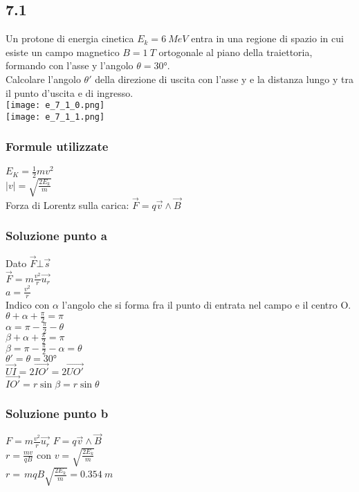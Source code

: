 \documentclass[../../main.tex]{subfiles}
\begin{document}
\subsection*{7.1}
Un protone di energia cinetica $E_k = 6\ MeV$ entra in una regione di spazio in cui esiste un campo magnetico $B = 1\ T$ ortogonale al piano della traiettoria, formando con l'asse y l'angolo $\theta = 30°$.
\\Calcolare l'angolo $\theta'$ della direzione di uscita con l'asse y e la distanza lungo y tra il punto d'uscita e di ingresso.
\\\texttt{[image: e\_7\_1\_0.png]}
\\\texttt{[image: e\_7\_1\_1.png]}
\subsubsection*{Formule utilizzate}
$E_K = \frac{1}{2}mv^2$
\\$|v| = \sqrt{\frac{2E_k}{m}}$
\\Forza di Lorentz sulla carica: $\vec{F}=q\vec{v}\wedge\vec{B}$
\subsubsection*{Soluzione punto a}
Dato $\vec{F}\bot \vec{s}$ 
\\$\vec{F} = m \frac{v^2}{r}\vec{u_r}$
\\$a= \frac{v^2}{r}$
\\Indico con $\alpha$ l'angolo che si forma fra il punto di entrata nel campo e il centro O.
\\$\theta + \alpha + \frac{\pi}{2} = \pi$
\\$\alpha = \pi - \frac{\pi}{2}-\theta$
\\$\beta + \alpha + \frac{\pi}{2} = \pi$
\\$\beta = \pi - \frac{\pi}{2} - \alpha = \theta$
\\$\theta' = \theta = 30°$
\\$\vec{UI} = 2\vec{IO'} = 2\vec{UO'}$
\\$\vec{IO'} = r \sin \beta = r\sin\theta$
\subsubsection*{Soluzione punto b}
$F = m\frac{v^2}{r}\vec{u_r}$   $F = q\vec{v}\wedge\vec{B}$
\\$r = \frac{mv}{qB}$ con $v=\sqrt{\frac{2E_k}{m}}$
\\$r = \frac{}{}{m}{qB}\sqrt{\frac{2E_k}{m}}=0.354\ m$
\newpage
\end{document}
